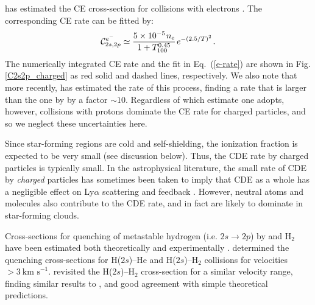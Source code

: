 \documentclass[fleqn,usenatbib]{mnras}
\newcommand\HeI{\ion{He}{I}\xspace} %
\begin{document}
\cite{Chibisov1969} has estimated the CE cross-section for collisions with electrons \citep[see also][p. 22]{Janev1987}. The corresponding CE rate can be fitted by:
\begin{equation}
     \mathcal{C}^{ e^-}_{2s,2p} \simeq \dfrac{5 \times 10^{-5} \hspace{1 pt} n_{\rm e}}{1 + T_{100}^{0.45} } \hspace{1 pt} e^{-(2.5/T)^2}  \label{e-rate} \hspace{1 pt} .
\end{equation}
The numerically integrated CE rate and the fit in Eq.~(\ref{e-rate}) are shown in Fig. \ref{C2s2p_charged} as red solid and dashed lines, respectively. We also note that more recently, \cite{Aggarwal2018} has estimated the rate of this process, finding a rate that is larger than the one by \cite{Chibisov1969} by a factor $\sim 10$. Regardless of which estimate one adopts, however, collisions with protons dominate the CE rate for charged particles, and so we neglect these uncertainties here. 

Since star-forming regions are cold and self-shielding, the ionization fraction is expected to be very small (see discussion below). Thus, the CDE rate by charged particles is typically small. In the astrophysical literature, the small rate of CDE by \textit{charged} particles has sometimes been taken to imply that CDE as a whole has a negligible effect on Ly$\alpha$ scattering and feedback \citep[e.g.][]{McKee2008}. However, neutral atoms and molecules also contribute to the CDE rate, and in fact are likely to dominate in star-forming clouds. 

Cross-sections for quenching of metastable hydrogen (i.e. $2s \rightarrow 2p$) by \HeI and H$_2$ have been estimated both theoretically and experimentally \citep[e.g.][]{Byron1971, Slocomb1971, Dose1974, Dose1975, Ryan1977, Vassilev1990, Terazawa1993}. \cite{Ryan1977} determined the quenching cross-sections for H($2s$)--He and H($2s$)--H$_2$ collisions for velocities $> 3 ~ \textrm{km s}^{-1}$. \cite{Vassilev1990} revisited the H($2s$)--H$_2$ cross-section for a similar velocity range, finding similar results to \cite{Ryan1977}, and good agreement with simple theoretical predictions. 
\end{document}
